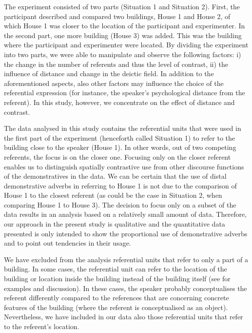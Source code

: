 \documentclass[output=paper,colorlinks,citecolor=brown]{langscibook}
\begin{document}
The experiment consisted of two parts (Situation 1 and Situation 2). First, the participant described and compared two buildings, House 1 and House 2, of which House 1 was closer to the location of the participant and experimenter. In the second part, one more building (House 3) was added. This was the building where the participant and experimenter were located. By dividing the experiment into two parts, we were able to manipulate and observe the following factors: i) the change in the number of referents and thus the level of contrast, ii) the influence of distance and change in the deictic field. In addition to the aforementioned aspects, also other factors may influence the choice of the referential expression (for instance, the speaker’s psychological distance from the referent). In this study, however, we concentrate on the effect of distance and contrast.

The data analysed in this study contains the referential units that were used in the first part of the experiment (henceforth called Situation 1) to refer to the building close to the speaker (House 1). In other words, out of two competing referents, the focus is on the closer one. Focusing only on the closer referent enables us to distinguish spatially contrastive use from other discourse functions of the demonstratives in the data. We can be certain that the use of distal demonstrative adverbs in referring to House 1 is not due to the comparison of House 1 to the closest referent (as could be the case in Situation 2, when comparing House 1 to House 3). The decision to focus only on a subset of the data results in an analysis based on a relatively small amount of data. Therefore, our approach in the present study is qualitative and the quantitative data presented is only intended to show the proportional use of demonstrative adverbs and to point out tendencies in their usage. 

We have excluded from the analysis referential units that refer to only a part of a building. In some cases, the referential unit can refer to the location of the building or location inside the building instead of the building itself (see  for examples and discussion). In these cases, the speaker probably conceptualises the referent differently compared to the references that are concerning concrete features of the building (where the referent is conceptualised as an object). Nevertheless, we have included in our data also those referential units that refer to the referent’s location.
\end{document}
